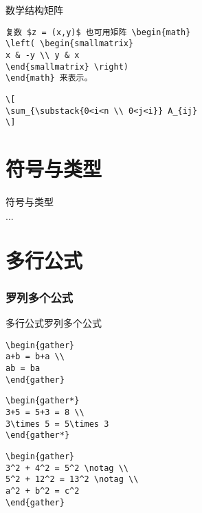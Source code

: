 \documentclass[11pt]{beamer}
\begin{document}
\begin{frame}[fragile]{数学结构}{矩阵}
\begin{lstlisting}
复数 $z = (x,y)$ 也可用矩阵 \begin{math}
\left( \begin{smallmatrix}
x & -y \\ y & x
\end{smallmatrix} \right)
\end{math} 来表示。
\end{lstlisting}
\begin{lstlisting}
\[
\sum_{\substack{0<i<n \\ 0<j<i}} A_{ij}
\]
\end{lstlisting}
\end{frame}

\part{符号与类型}

\begin{frame}[fragile]{符号与类型}
\begin{center}	$\dots$ \end{center}
\end{frame}

\part{多行公式}

\section{罗列多个公式}

\begin{frame}[fragile]{多行公式}{罗列多个公式}
\begin{lstlisting}
\begin{gather}
a+b = b+a \\
ab = ba
\end{gather}
\end{lstlisting}
\begin{lstlisting}
\begin{gather*}
3+5 = 5+3 = 8 \\
3\times 5 = 5\times 3
\end{gather*}
\end{lstlisting}
\begin{lstlisting}
\begin{gather}
3^2 + 4^2 = 5^2 \notag \\
5^2 + 12^2 = 13^2 \notag \\
a^2 + b^2 = c^2
\end{gather}
\end{lstlisting}
\end{frame}
\end{document}
